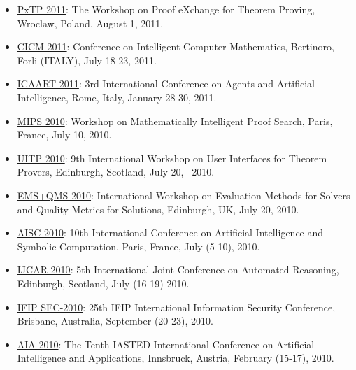 \documentclass{letter}
\begin{document}
{{\begin{itemize}
  \item \href{}{PxTP 2011}: The Workshop on Proof eXchange for Theorem
  Proving, Wroclaw, Poland, August 1, 2011.
  
  \item \href{http://cicm11.cs.unibo.it/cicm11/}{CICM 2011}: Conference on
  Intelligent Computer Mathematics, Bertinoro, Forli (ITALY), July 18-23,
  2011.
  
  \item \href{http://www.icaart.org/}{ICAART 2011}: 3rd International
  Conference on Agents and Artificial Intelligence, Rome, Italy, January
  28-30, 2011.
  
  \item \href{http://www.informatik.uni-bremen.de/\~{
  }autexier/mips2010/}{MIPS 2010}: Workshop on Mathematically Intelligent
  Proof Search, Paris, France, July 10, 2010.
  
  \item \href{http://uitp10.cs.unibo.it/}{UITP 2010}: 9th International
  Workshop on User Interfaces for Theorem Provers, {\small Edinburgh,
  Scotland, July 20, \ 2010.}
  
  \item \href{http://clc.cs.uiowa.edu/EMSQMS/}{EMS+QMS 2010}: International
  Workshop on Evaluation Methods for Solvers and Quality Metrics for
  Solutions, Edinburgh, UK, July 20, 2010.
  
  \item \href{http://www.informatik.uni-bremen.de/\~{
  }autexier/aisc2010/}{AISC-2010}: 10th International Conference on Artificial
  Intelligence and Symbolic Computation, Paris, France, July (5-10), 2010.
  
  \item \href{http://www.floc-conference.org}{IJCAR-2010}: 5th International
  Joint Conference on Automated Reasoning{\small , Edinburgh, Scotland, July
  (16-19) 2010.}
  
  \item \href{http://www.wcc2010.org/SEC2010/}{IFIP SEC-2010}: 25th IFIP
  International Information Security Conference, Brisbane, Australia,
  September (20-23), 2010.
  
  \item \href{http://www.iasted.org/CONFERENCES/ipc-674.html}{AIA 2010}: The
  Tenth IASTED International Conference on Artificial Intelligence and
  Applications, Innsbruck, Austria, February (15-17), 2010.
  

\end{itemize}}}
\end{document}
